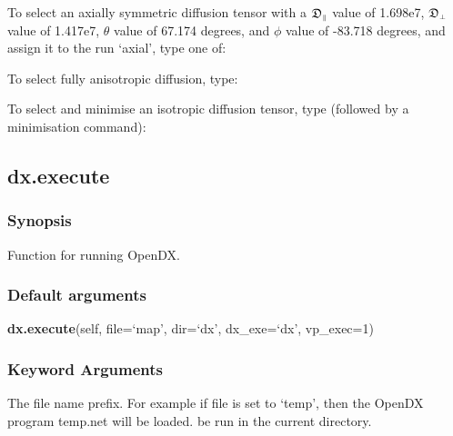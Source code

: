 
To select an axially symmetric diffusion tensor with a $\mathfrak{D}_{\scriptscriptstyle \parallel}$ value of 1.698e7, $\mathfrak{D}_{\scriptscriptstyle \perp}$ value of
1.417e7, $\theta$ value of 67.174 degrees, and $\phi$ value of -83.718 degrees, and assign it to
the run `axial', type one of:






To select fully anisotropic diffusion, type:


To select and minimise an isotropic diffusion tensor, type (followed by a minimisation
command):




\newpage

\subsection{dx.execute}


\subsubsection{Synopsis}

Function for running OpenDX.

\subsubsection{Default arguments}

\textsf{\textbf{dx.execute}(self, file=`map', dir=`dx', dx\_exe=`dx', vp\_exec=1)}


\subsubsection{Keyword Arguments}

  The file name prefix.  For example if file is set to `temp', then the OpenDX program temp.net will be loaded.
be run in the current directory.

